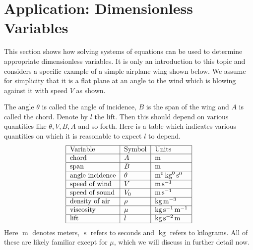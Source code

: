 \section{Application: Dimensionless Variables}

\begingroup  %

\def\m{\mathop{\textrm{m}}\nolimits}
\def\kg{\mathop{\textrm{kg}}\nolimits}
\def\s{\mathop{\textrm{s}}\nolimits}

This section shows how solving systems of equations can be used to
determine appropriate dimensionless variables. It is only an
introduction to this topic and considers a specific example of a
simple airplane wing shown below. We assume for simplicity that it is a flat plane at an angle to the wind which is blowing against it
with speed $V$ as shown.

\begin{center}
\end{center}

The angle $\theta$ is called the angle of incidence, $B$ is the span of the wing and $A$ is called the chord. Denote by $l$ the lift. Then this should depend on
various quantities like $\theta ,V,B,A$ and so forth. Here is a table which
indicates various quantities on which it is reasonable to expect $l$ to
depend. 
\begin{equation*}
\begin{tabular}{|l|l|l|}
\hline
Variable & Symbol & Units \\ \hline
chord & $A$ & $\m$ \\ \hline
span & $B$ & $\m$ \\ \hline
angle incidence & $\theta $ & $\m^{0}\kg^{0}\s ^{0}$ \\ \hline
speed of wind & $V$ & $\m\s ^{-1}$ \\ \hline
speed of sound & $V_{0}$ & $\m\s ^{-1}$ \\ \hline
density of air & $\rho $ & $\kg\m^{-3}$ \\ \hline
viscosity & $\mu $ & $\kg\s ^{-1}\m^{-1}$ \\ \hline
lift & $l$ & $\kg\s ^{-2}\m$ \\ \hline
\end{tabular}
\end{equation*}
Here $\m$ denotes meters, $\s $ refers to seconds and $\kg$ refers to
kilograms. All of these are likely familiar except for $\mu $, which we will discuss in further detail now. 

